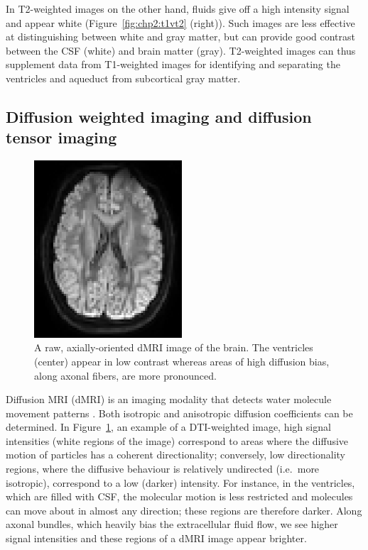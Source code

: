 %
%
In T2-weighted images on the other hand, fluids give off a high
intensity signal and appear white (Figure~\ref{fig:chp2:t1vt2}
(right)). Such images are less effective at distinguishing between
white and gray matter, but can provide good contrast between the CSF
(white) and brain matter (gray). T2-weighted images can thus
supplement data from T1-weighted images for identifying and separating
the ventricles and aqueduct from subcortical gray matter.

\subsection{Diffusion weighted imaging and diffusion tensor imaging}

\begin{figure}
  \sidecaption
  \centering
  \includegraphics[width=0.49\textwidth]{./graphics/chp2/DTI-slice-image-crop.png}
  \caption{A raw, axially-oriented dMRI image of the brain. The ventricles (center) 
appear in low contrast whereas areas of high diffusion bias, along axonal fibers, 
are more pronounced.}
  \label{fig:chp2:dti}
\end{figure}

%
%
Diffusion MRI (dMRI) is an imaging modality that detects water
molecule movement patterns \cite{jeurissen2017,soares2013hitchhiker}.
Both isotropic and anisotropic diffusion coefficients can be
determined. In Figure~\ref{fig:chp2:dti}, an example of a DTI-weighted
image, high signal intensities (white regions of the image) correspond
to areas where the diffusive motion of particles has a coherent
directionality; conversely, low directionality regions, where the
diffusive behaviour is relatively undirected (i.e.~more isotropic),
correspond to a low (darker) intensity. For instance, in the
ventricles, which are filled with CSF, the molecular
motion is less restricted and molecules can move about in almost any
direction; these regions are therefore darker.  Along axonal
bundles, which heavily bias the extracellular fluid flow, we see
higher signal intensities and these regions of a dMRI image appear
brighter.

